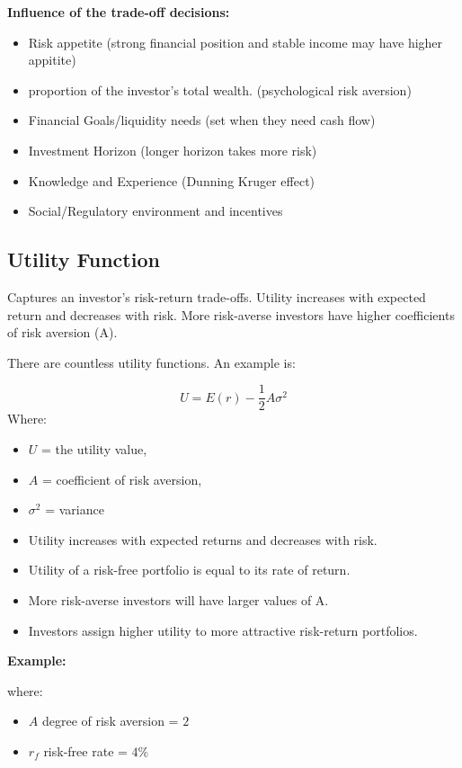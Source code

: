 \documentclass[
]{book}
\providecommand{\tightlist}{%
  \setlength{\itemsep}{0pt}\setlength{\parskip}{0pt}}
\begin{document}
\textbf{Influence of the trade-off decisions:}

\begin{itemize}
\tightlist
\item
  Risk appetite (strong financial position and stable income may have
  higher appitite)
\item
  proportion of the investor's total wealth. (psychological risk
  aversion)
\item
  Financial Goals/liquidity needs (set when they need cash flow)
\item
  Investment Horizon (longer horizon takes more risk)
\item
  Knowledge and Experience (Dunning Kruger effect)
\item
  Social/Regulatory environment and incentives
\end{itemize}

\hypertarget{utility-function}{%
\subsection{Utility Function}\label{utility-function}}

Captures an investor's risk-return trade-offs. Utility increases with
expected return and decreases with risk. More risk-averse investors have
higher coefficients of risk aversion (A).

There are countless utility functions. An example is:

\[
U = E(r) - \frac{1}{2} A \sigma^2
\] Where:

\begin{itemize}
\tightlist
\item
  \(U\) = the utility value,
\item
  \(A\) = coefficient of risk aversion,
\item
  \(\sigma^2\) = variance
\item
  Utility increases with expected returns and decreases with risk.
\item
  Utility of a risk-free portfolio is equal to its rate of return.
\item
  More risk-averse investors will have larger values of A.
\item
  Investors assign higher utility to more attractive risk-return
  portfolios.
\end{itemize}

\textbf{Example:}

where:

\begin{itemize}
\tightlist
\item
  \(A\) degree of risk aversion = \(2\)
\item
  \(r_f\) risk-free rate = \(4\%\)
\end{itemize}
\end{document}
